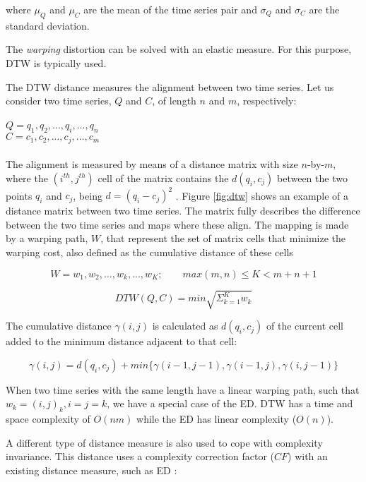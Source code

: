 where $\mu_Q$ and $\mu_C$ are the mean of the time series pair and $\sigma_Q$ and $\sigma_C$ are the standard deviation.

The \textit{warping} distortion can be solved with an elastic measure. For this purpose, DTW is typically used.
\par
The DTW distance measures the alignment between two time series. Let us consider two time series, $Q$ and $C$, of length $n$ and $m$, respectively:\\
\\
$Q = q_1, q_2, ..., q_i, ..., q_n$\\
$C = c_1, c_2, ..., c_j, ..., c_m$\\
\\
The alignment is measured by means of a distance matrix with size $n$-by-$m$, where the $(i^{th},j^{th})$ cell of the matrix contains the $d(q_i, c_j)$ between the two points $q_i$ and $c_j$, being $d=(q_i - c_j)^2$ \cite{dtw}. Figure \ref{fig:dtw} shows an example of a distance matrix between two time series. The matrix fully describes the difference between the two time series and maps where these align. The mapping is made by a warping path, $W$, that represent the set of matrix cells that minimize the warping cost, also defined as the cumulative distance of these cells \cite{dtw}

\begin{equation}
W = w_1, w_2, ..., w_k, ..., w_K; \quad \quad max(m,n) \leq K < m+n+1
\end{equation} 

\begin{equation}
DTW(Q,C) = min \sqrt{\Sigma^K_{k=1} w_k}
\end{equation} 

The cumulative distance $\gamma(i,j)$ is calculated as $d(q_i,c_j)$ of the current cell added to the minimum distance adjacent to that cell:

\begin{equation}
\gamma(i,j) = d(q_i,c_j)+min\{\gamma(i-1,j-1), \gamma(i-1, j), \gamma(i, j-1)\}
\end{equation} 

When two time series with the same length have a linear warping path, such that $w_k=(i,j)_k, i=j=k$, we have a special case of the ED. DTW has a time and space complexity of $O(nm)$ while the ED has linear complexity ($O(n)$).
\par
A different type of distance measure is also used to cope with complexity invariance. This distance uses a complexity correction factor ($CF$) with an existing distance measure, such as ED \cite{complexity}:

